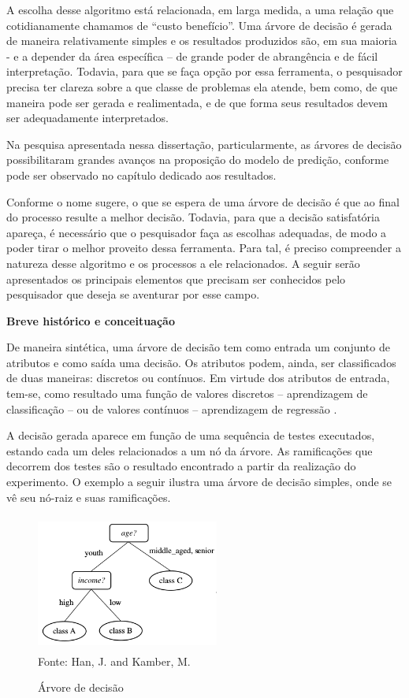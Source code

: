 A escolha desse algoritmo está relacionada, em larga medida, a uma relação que cotidianamente chamamos de “custo benefício”. Uma árvore de decisão é gerada de maneira relativamente simples e os resultados produzidos são, em sua maioria - e a depender da área específica – de grande poder de abrangência e de fácil interpretação. Todavia, para que se faça opção por essa ferramenta, o pesquisador precisa ter clareza sobre a que classe de problemas ela atende, bem como, de que maneira pode ser gerada e realimentada, e de que forma seus resultados devem ser adequadamente interpretados.

Na pesquisa apresentada nessa dissertação, particularmente, as árvores de decisão possibilitaram grandes avanços na proposição do modelo de predição, conforme pode ser observado no capítulo dedicado aos resultados. 

Conforme o nome sugere, o que se espera de uma árvore de decisão é que ao final do processo resulte a melhor decisão. Todavia, para que a decisão satisfatória apareça, é necessário que o pesquisador faça as escolhas adequadas, de modo a poder tirar o melhor proveito dessa ferramenta. Para tal, é preciso compreender a natureza desse algoritmo e os processos a ele relacionados. A seguir serão apresentados os principais elementos que precisam ser conhecidos pelo pesquisador que deseja se aventurar por esse campo.

\vspace{5mm}
\textbf{Breve histórico e conceituação}
\vspace{5mm}

De maneira sintética, uma árvore de decisão tem como entrada um conjunto de atributos e como saída uma decisão. Os atributos podem, ainda, ser classificados de duas maneiras: discretos ou contínuos. Em virtude dos atributos de entrada, tem-se, como resultado uma função de valores discretos – aprendizagem de classificação – ou de valores contínuos – aprendizagem de regressão \cite{NorvigRussel2004}.

A decisão gerada aparece em função de uma sequência de testes executados, estando cada um deles relacionados a um nó da árvore. As ramificações que decorrem dos testes são o resultado encontrado a partir da realização do experimento. 
O exemplo a seguir ilustra uma árvore de decisão simples, onde se vê seu nó-raiz e suas ramificações. 


\begin{figure}[!ht]
	\centering
	\caption{Árvore de decisão}
	\includegraphics[width=60mm, height=45mm]{Figuras/Arvore/arvorejovem.png}\\
	\tiny Fonte: Han, J. and Kamber, M. 
\end{figure} 


